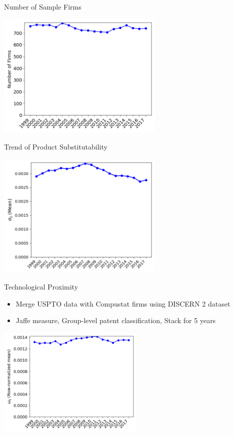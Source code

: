 \documentclass[
  aspectratio=169,  %
  handout           %
]{beamer}
\theoremstyle{plain}
\begin{document}
%
\begin{frame}{Number of Sample Firms}
  \begin{center}
    \includegraphics[width=8cm]{figures/number_of_firm}
    \par\end{center}

\end{frame}

\begin{frame}{Trend of Product Substitutability}
  \begin{center}
    \includegraphics[width=8cm]{figures/sigma}
  \par\end{center}

\end{frame}

\begin{frame}{Technological Proximity }
  \begin{itemize}
    \item Merge USPTO data with Compustat firms using DISCERN 2 dataset \citep{Arora2024-ad}
    \item Jaffe measure, Group-level patent classification, Stack for 5 years
  \end{itemize}
  \begin{center}
    \includegraphics[width=7cm]{figures/omega}
    \par\end{center}
\end{frame}
\end{document}
